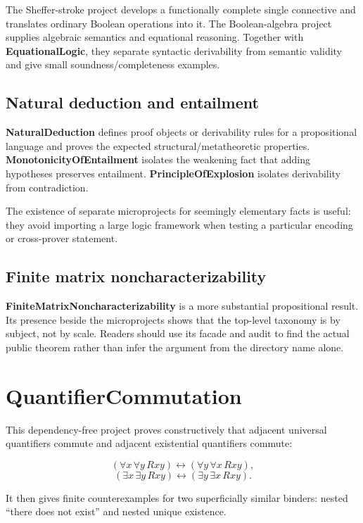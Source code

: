 \documentclass[
  10pt,
  a4paper,
  twoside,
  open=any,
  parskip=half,
  headings=big
]{scrreprt}
\newcommand{\project}[1]{\textsf{\bfseries #1}}
\begin{document}
The Sheffer-stroke project develops a functionally complete single connective
and translates ordinary Boolean operations into it.  The Boolean-algebra
project supplies algebraic semantics and equational reasoning.  Together with
\project{EquationalLogic}, they separate syntactic derivability from semantic
validity and give small soundness/completeness examples.

\subsection{Natural deduction and entailment}

\project{NaturalDeduction} defines proof objects or derivability rules for a
propositional language and proves the expected structural/metatheoretic
properties.  \project{MonotonicityOfEntailment} isolates the weakening fact
that adding hypotheses preserves entailment.  \project{PrincipleOfExplosion}
isolates derivability from contradiction.

The existence of separate microprojects for seemingly elementary facts is
useful: they avoid importing a large logic framework when testing a particular
encoding or cross-prover statement.

\subsection{Finite matrix noncharacterizability}

\project{FiniteMatrixNoncharacterizability} is a more substantial
propositional result.  Its presence beside the microprojects shows that the
top-level taxonomy is by subject, not by scale.  Readers should use its facade
and audit to find the actual public theorem rather than infer the argument from
the directory name alone.

\section{QuantifierCommutation}
\label{sec:quantifier-commutation}

This dependency-free project proves constructively that adjacent universal
quantifiers commute and adjacent existential quantifiers commute:

\[
(\forall x\,\forall y\,Rxy)\leftrightarrow
(\forall y\,\forall x\,Rxy),
\]
\[
(\exists x\,\exists y\,Rxy)\leftrightarrow
(\exists y\,\exists x\,Rxy).
\]

It then gives finite counterexamples for two superficially similar binders:
nested ``there does not exist'' and nested unique existence.
\end{document}
